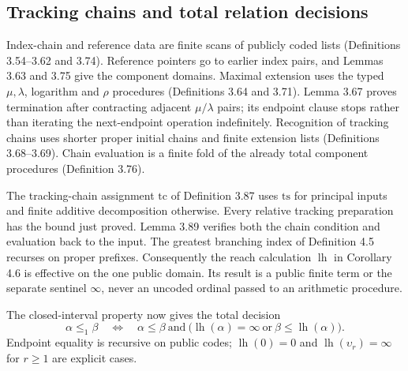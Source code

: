 \documentclass[11pt]{article}
\newcommand{\up}{\upsilon}
\begin{document}
\subsection{Tracking chains and total relation decisions}

Index-chain and reference data are finite scans of publicly coded
lists (Definitions 3.54--3.62 and 3.74). Reference pointers go to
earlier index pairs, and Lemmas 3.63 and 3.75 give the component
domains. Maximal extension uses the typed $\mu,\lambda$, logarithm
and $\rho$ procedures (Definitions 3.64 and 3.71). Lemma 3.67 proves
termination after contracting adjacent $\mu/\lambda$ pairs; its
endpoint clause stops rather than iterating the next-endpoint
operation indefinitely. Recognition of tracking chains uses shorter
proper initial chains and finite extension lists (Definitions
3.68--3.69). Chain evaluation is a finite fold of the already total
component procedures (Definition 3.76).

The tracking-chain assignment $\mathrm{tc}$ of Definition 3.87
uses $\mathrm{ts}$ for principal inputs and finite additive
decomposition otherwise. Every relative tracking preparation has
the bound just proved. Lemma 3.89 verifies both the chain condition
and evaluation back to the input. The greatest branching index
of Definition 4.5 recurses on proper prefixes. Consequently the
reach calculation $\operatorname{lh}$ in Corollary 4.6 is effective
on the one public domain. Its result is a public finite term or
the separate sentinel $\infty$, never an uncoded ordinal passed
to an arithmetic procedure.

The closed-interval property now gives the total decision
\begin{equation}\label{eq:le1}
 \alpha\le_1\beta\quad\Longleftrightarrow\quad
 \alpha\le\beta\ \text{and}\
 \bigl(\operatorname{lh}(\alpha)=\infty
       \ \text{or}\ \beta\le\operatorname{lh}(\alpha)\bigr).
\end{equation}
Endpoint equality is recursive on public codes;
$\operatorname{lh}(0)=0$ and
$\operatorname{lh}(\up_r)=\infty$ for $r\ge1$ are explicit cases.
\end{document}
